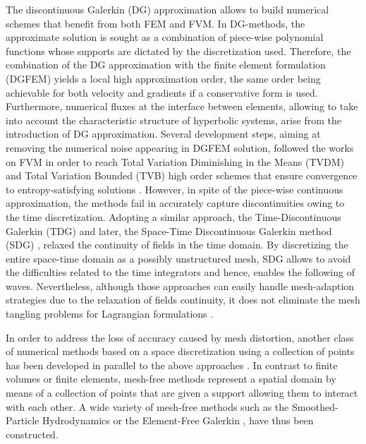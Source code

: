 The discontinuous Galerkin (DG) approximation \cite{NeutronDG} allows to build numerical schemes that benefit from both FEM and FVM.
In DG-methods, the approximate solution is sought as a combination of piece-wise polynomial functions whose supports are dictated by the discretization used.
Therefore, the combination of the DG approximation with the finite element formulation (DGFEM) yields a local high approximation order, the same order being achievable for both velocity and gradients if a conservative form is used.
Furthermore, numerical fluxes at the interface between elements, allowing to take into account the characteristic structure of hyperbolic systems, arise from the introduction of DG approximation.
Several development steps, aiming at removing the numerical noise appearing in DGFEM solution, followed the works on FVM in order to reach Total Variation Diminishing in the Means (TVDM) and Total Variation Bounded (TVB) high order schemes that ensure convergence to entropy-satisfying solutions \cite{Cockburn}.
However, in spite of the piece-wise continuous approximation, the methods fail in accurately capture discontinuities owing to the time discretization.
Adopting a similar approach, the Time-Discontinuous Galerkin (TDG) \cite{Hughes_TDG} and later, the Space-Time Discontinuous Galerkin method (SDG) \cite{ST_DGFEM1}, relaxed the continuity of fields in the time domain. 
By discretizing the entire space-time domain as a possibly unstructured mesh, SDG allows to avoid the difficulties related to the time integrators and hence, enables the following of waves.
Nevertheless, although those approaches can easily handle mesh-adaption strategies due to the relaxation of fields continuity, it does not eliminate the mesh tangling problems for Lagrangian formulations \cite{FVilar_DG}.

In order to address the loss of accuracy caused by mesh distortion, another class of numerical methods based on a space discretization using a collection of points has been developed in parallel to the above approaches \cite{Belytschko_Meshless,Meshless}.
In contrast to finite volumes or finite elements, mesh-free methods represent a spatial domain by means of a collection of points that are given a support allowing them to interact with each other.
A wide variety of mesh-free methods such as the Smoothed-Particle Hydrodynamics \cite{SPH} or the Element-Free Galerkin \cite{Belytschko_EFG}, have thus been constructed.

